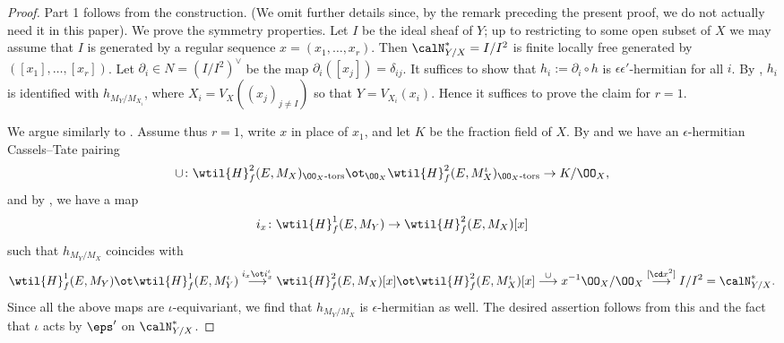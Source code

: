 \begin{proof} Part 1 follows from the construction. (We omit further details since, by the remark preceding the present proof, we do not actually need it in this paper).
We prove the symmetry properties. Let $I$ be the ideal sheaf of $Y$; up to restricting to some open subset of $X$ we may assume that $I$ is generated by a regular sequence $x=(x_{1}, \ldots, x_{r})$. Then $\calN_{Y/X}^* = I/I^2$ is finite locally free generated by $([x_1], \ldots, [x_r])$. Let $\partial_i \in N = (I/I^2)^\vee$ be the map $\partial_i([x_j])=\delta_{ij}$. It suffices to show that $h_i:=\partial_i \circ h$ is   $\epsilon \epsilon'$-hermitian
 for all $i$. By \cite[Appendix C, Proposition 0.5]{venerucci-thesis}, $h_i$ is identified with $ h_{M_{Y}/M_{X_{i}}}$,  where $X_i=V_{X}((x_j)_{j\neq I})$ so that $Y=V_{X_{i}}(x_{i})$. Hence it suffices to prove the claim for $r=1$.

We argue similarly to \cite[Proof of Corollary 10.10]{venerucci-thesis}.  Assume thus $r=1$, write $x $ in place of $x_{1}$, and let $K$ be the fraction field of $X$. By  \cite{nek-selmer} and \cite[Appendix A, \S~ 0.7]{venerucci-thesis} we have an $\epsilon$-hermitian Cassels--Tate pairing
$$\cup \colon \wtil{H}^{2}_{f}(E, M_{X})_{\text{$\OO_{X}$-tors}}
 \ot_{\OO_{X}} \wtil{H}^{2}_{f}(E, M_{X}^{\iota})_{\text{$\OO_{X}$-tors}} \to K/\OO_{X},$$
and by \cite[Appendix C, Proposition 0.17]{venerucci-thesis}, we have a map
 $$ i_{x}\colon \wtil{H}^{1}_{f}(E, M_{Y})\to  \wtil{H}^{2}_{f}(E, M_{X})[x]$$
 such that $h_{M_{Y}/M_{X}}$ coincides with
$$ \wtil{H}^{1}_{f}(E, M_{Y}) \ot  \wtil{H}^{1}_{f}(E, M^{\iota}_{Y})
\stackrel{i_{x}\ot i_{x}^{\iota}}{\longrightarrow}
 \wtil{H}^{2}_{f}(E, M_{X})[x]\ot  \wtil{H}^{2}_{f}(E, M^{\iota}_{X})[x]
 \stackrel{\cup}{\longrightarrow}  x^{-1}\OO_{X}/\OO_{X}  \stackrel{[\cd x^{2}]}{\longrightarrow}  I/I^{2}= \calN^{*}_{Y/X}.$$
Since all the above maps are $\iota$-equivariant, we find that $h_{M_{Y}/M_{X}}$ is $\epsilon$-hermitian as well. The desired assertion follows from this and the fact that $\iota $ acts by $\eps'$ on $\calN^{*}_{Y/X}$.
 \end{proof}

